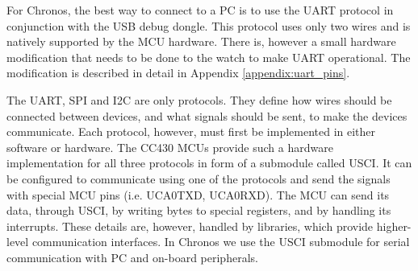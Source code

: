 For Chronos, the best way to connect to a PC is to use the UART protocol in conjunction with the USB debug dongle. This protocol uses only two wires and is natively supported by the MCU hardware. There is, however a small hardware modification that needs to be done to the watch to make UART operational. The modification is described in detail in Appendix \ref{appendix:uart_pins}.

The UART, SPI and I2C are only protocols. They define how wires should be connected between devices, and what signals should be sent, to make the devices communicate. Each protocol, however, must first be implemented in either software or hardware. The CC430 MCUs provide such a hardware implementation for all three protocols in form of a submodule called USCI. It can be configured to communicate using one of the protocols and send the signals with special MCU pins (i.e. UCA0TXD, UCA0RXD). The MCU can send its data, through USCI, by writing bytes to special registers, and by handling its interrupts. These details are, however, handled by libraries, which provide higher-level communication interfaces. In Chronos we use the USCI submodule for serial communication with PC and on-board peripherals.

